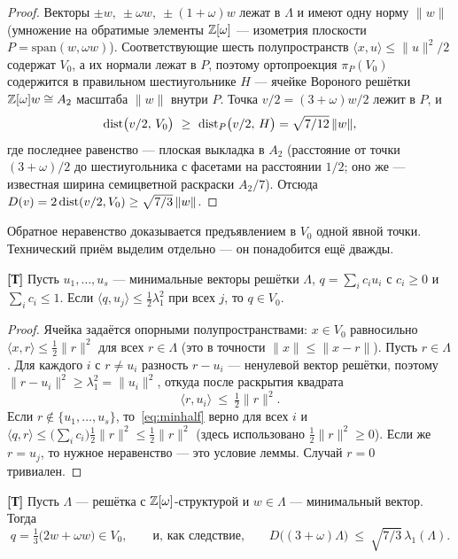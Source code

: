 \begin{proof}
Векторы $\pm w,\ \pm\omega w,\ \pm(1+\omega)w$ лежат в $\Lambda$ и имеют одну
норму $\|w\|$ (умножение на обратимые элементы $\mathbb{Z}[\omega]$ --- изометрия
плоскости $P=\mathrm{span}(w,\omega w)$). Соответствующие шесть полупространств
$\langle x,u\rangle\le\|u\|^2/2$ содержат $V_0$, а их нормали лежат в $P$,
поэтому ортопроекция $\pi_P(V_0)$ содержится в правильном шестиугольнике $H$ ---
ячейке Вороного решётки $\mathbb{Z}[\omega]w\cong A_2$ масштаба $\|w\|$ внутри $P$.
Точка $v/2=(3+\omega)w/2$ лежит в $P$, и
\[
\dist\bigl(v/2,\,V_0\bigr)\ \ge\ \dist_P\bigl(v/2,\,H\bigr)
=\sqrt{7/12}\,\|w\|,
\]
где последнее равенство --- плоская выкладка в $A_2$ (расстояние от точки
$(3+\omega)/2$ до шестиугольника с фасетами на расстоянии $1/2$; оно же ---
известная ширина семицветной раскраски $A_2/7$). Отсюда
$D(v)=2\operatorname{dist}(v/2,V_0)\ge\sqrt{7/3}\,\|w\|$.
\end{proof}

Обратное неравенство доказывается предъявлением в $V_0$ одной явной точки.
Технический приём выделим отдельно --- он понадобится ещё дважды.

\begin{lemma}\label{lem:cellpoint}
\textbf{[Т]} Пусть $u_1,\dots,u_s$ --- минимальные векторы решётки $\Lambda$,
$q=\sum_i c_iu_i$ с $c_i\ge0$ и $\sum_ic_i\le1$. Если
$\langle q,u_j\rangle\le\frac12\lambda_1^2$ при всех $j$, то $q\in V_0$.
\end{lemma}

\begin{proof}
Ячейка задаётся опорными полупространствами: $x\in V_0$ равносильно
$\langle x,r\rangle\le\frac12\|r\|^2$ для всех $r\in\Lambda$ (это в точности
$\|x\|\le\|x-r\|$). Пусть $r\in\Lambda$. Для каждого $i$ с $r\ne u_i$ разность
$r-u_i$ --- ненулевой вектор решётки, поэтому
$\|r-u_i\|^2\ge\lambda_1^2=\|u_i\|^2$, откуда после раскрытия квадрата
\begin{equation}\label{eq:minhalf}
\langle r,u_i\rangle\ \le\ \tfrac12\|r\|^2 .
\end{equation}
Если $r\notin\{u_1,\dots,u_s\}$, то~\eqref{eq:minhalf} верно для всех $i$ и
$\langle q,r\rangle\le\bigl(\sum_ic_i\bigr)\frac12\|r\|^2\le\frac12\|r\|^2$
(здесь использовано $\frac12\|r\|^2\ge0$). Если же $r=u_j$, то нужное
неравенство --- это условие леммы. Случай $r=0$ тривиален.
\end{proof}

\begin{proposition}\label{prop:eisup}
\textbf{[Т]} Пусть $\Lambda$ --- решётка с $\mathbb{Z}[\omega]$-структурой и
$w\in\Lambda$ --- минимальный вектор. Тогда
\[
q=\tfrac13\bigl(2w+\omega w\bigr)\in V_0,
\qquad\text{и, как следствие,}\qquad
D\bigl((3+\omega)\Lambda\bigr)\ \le\ \sqrt{7/3}\,\lambda_1(\Lambda).
\]
\end{proposition}

